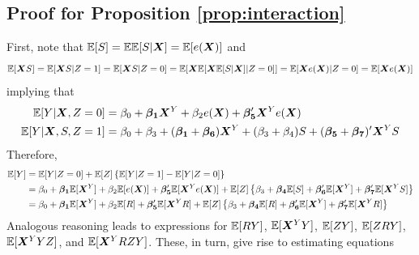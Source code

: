 \documentclass[11pt]{article} %
\begin{document}
\subsection{Proof for Proposition \ref{prop:interaction}}
First, note that $\mathbb{E}[S]=\mathbb{E}\mathbb{E}[S|\bm{X}]=\mathbb{E}[e(\bm{X})]$ and
$$\mathbb{E}[\bm{X} S]=\mathbb{E}[\bm{X} S|Z=1]=\mathbb{E}[\bm{X} S|Z=0]=\mathbb{E}[\bm{X} \mathbb{E}[\bm{X}\mathbb{E}[S|\bm{X}]|Z=0]]=\mathbb{E}[\bm{X}e(\bm{X})|Z=0]=\mathbb{E}[\bm{X}e(\bm{X})]$$
implying that
\begin{equation*}
  \begin{split}
    \mathbb{E}[Y|\bm{X},Z=0]&=\beta_0+\bm{\beta_1}\bm{X}^Y+\beta_2e(\bm{X})+\bm{\beta_5}'\bm{X}^Ye(\bm{X})\\
    \mathbb{E}[Y|\bm{X},S,Z=1]&=\beta_0+\beta_3+(\bm{\beta_1}+\bm{\beta_6})\bm{X}^Y+(\beta_3+\beta_4)S+(\bm{\beta_5}+\bm{\beta_7})'\bm{X}^Y S
  \end{split}
\end{equation*}
Therefore,
\begin{align*}
  \mathbb{E}[Y]&=\mathbb{E}[Y|Z=0]+\mathbb{E}[Z]\left\{\mathbb{E}[Y|Z=1]-\mathbb{E}[Y|Z=0]\right\}\\
  &=\beta_0+\bm{\beta_1}\mathbb{E}[\bm{X}^Y]+\beta_2\mathbb{E}[e(\bm{X})]+\bm{\beta_5}'\mathbb{E}[\bm{X}^Ye(\bm{X})]+\mathbb{E}[Z]\left\{\beta_3+\bm{\beta_4}\mathbb{E}[S]+\bm{\beta_6}'\mathbb{E}[\bm{X}^Y]+\bm{\beta_7}'\mathbb{E}[\bm{X}^Y S]\right\}\\
  &=\beta_0+\bm{\beta_1}\mathbb{E}[\bm{X}^Y]+\beta_2\mathbb{E}[R]+\bm{\beta_5}'\mathbb{E}[\bm{X}^Y R]+\mathbb{E}[Z]\left\{\beta_3+\bm{\beta_4}\mathbb{E}[R]+\bm{\beta_6}'\mathbb{E}[\bm{X}^Y]+\bm{\beta_7}'\mathbb{E}[\bm{X}^Y R]\right\}\\
\end{align*}
Analogous reasoning leads to expressions for $\mathbb{E}[RY]$, $\mathbb{E}[\bm{X}^Y Y]$, $\mathbb{E}[ZY]$,  $\mathbb{E}[ZRY]$, $\mathbb{E}[\bm{X}^Y YZ]$, and $\mathbb{E}[\bm{X}^Y RZY]$.
These, in turn, give rise to estimating equations
\end{document}

